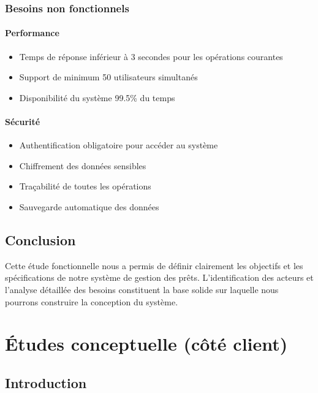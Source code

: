 \documentclass[12pt,a4paper]{report}
\begin{document}
\subsection{Besoins non fonctionnels}

\subsubsection{Performance}
\begin{itemize}
    \item Temps de réponse inférieur à 3 secondes pour les opérations courantes
    \item Support de minimum 50 utilisateurs simultanés
    \item Disponibilité du système 99.5\% du temps
\end{itemize}

\subsubsection{Sécurité}
\begin{itemize}
    \item Authentification obligatoire pour accéder au système
    \item Chiffrement des données sensibles
    \item Traçabilité de toutes les opérations
    \item Sauvegarde automatique des données
\end{itemize}

\section{Conclusion}

Cette étude fonctionnelle nous a permis de définir clairement les objectifs et les spécifications de notre système de gestion des prêts. L'identification des acteurs et l'analyse détaillée des besoins constituent la base solide sur laquelle nous pourrons construire la conception du système.

\newpage

\chapter{Études conceptuelle (côté client)}

\section{Introduction}
\end{document}
